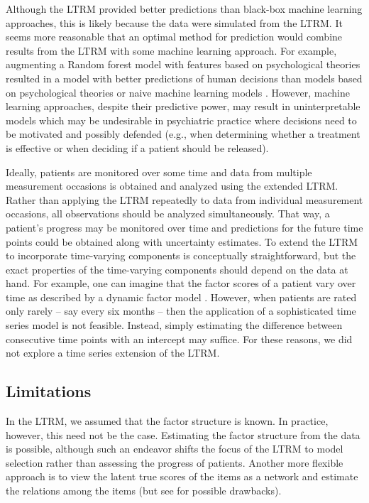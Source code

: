 \documentclass[a4paper,usenames,dvipsnames]{article}
\newcommand{\DON}	[1] 	{}%
\newcommand{\MR}	[1] 	{}%
\begin{document}
Although the LTRM provided better predictions than black-box machine learning approaches, this is likely because the data were simulated from the LTRM. It seems more reasonable that an optimal method for prediction would combine results from the LTRM with some machine learning approach. For example, augmenting a Random forest model with features based on psychological theories resulted in a model with better predictions of human decisions than models based on psychological theories or naive machine learning models \cite{plonsky2019predicting, plonsky2017psychological}. However, machine learning approaches, despite their predictive power, may result in uninterpretable models which may be undesirable in psychiatric practice where decisions need to be motivated and possibly defended (e.g., when determining whether a treatment is effective or when deciding if a patient should be released).

Ideally, patients are monitored over some time and data from multiple measurement occasions is obtained and analyzed using the extended LTRM. Rather than applying the LTRM repeatedly to data from individual measurement occasions, all observations should be analyzed simultaneously. That way, a patient's progress may be monitored over time and predictions for the future time points could be obtained along with uncertainty estimates. To extend the LTRM to incorporate time-varying components is conceptually straightforward, but the exact properties of the time-varying components should depend on the data at hand. For example, one can imagine that the factor scores of a patient vary over time as described by a dynamic factor model \cite{molenaar1985dynamic, forni2000generalized}. However, when patients are rated only rarely -- say every six months -- then the application of a sophisticated time series model is not feasible. Instead, simply estimating the difference between consecutive time points with an intercept may suffice. For these reasons, we did not explore a time series extension of the LTRM.

\subsection*{Limitations}

In the LTRM, we assumed that the factor structure is known. In practice, however, this need not be the case. Estimating the factor structure from the data is possible, although such an endeavor shifts the focus of the LTRM to model selection rather than assessing the progress of patients. Another more flexible approach is to view the latent true scores of the items as a network and estimate the relations among the items (but see  for possible drawbacks).\MR{I find it hard to imagine a situation in which patients would be rated on a bunch of items with no known factor structure.}\DON{Maybe verification of a new questionnaire that is supposed to measure something similar, or a translation of a questionnaire?}
\end{document}
